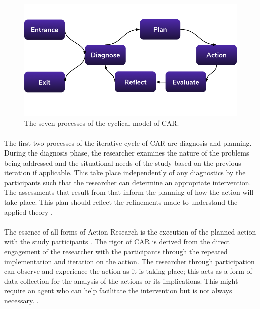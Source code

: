 \begin{figure}[h!]
    \centering
    \includegraphics[width=\linewidth]{Figures/CAR.png}
    \caption{The seven processes of the cyclical model of CAR.}
\end{figure}

\paragraph{} The first two processes of the iterative cycle of CAR are diagnosis and planning. During the diagnosis phase, the researcher examines the nature of the problems being addressed and the situational needs of the study based on the previous iteration if applicable. This take place independently of any diagnostics by the participants such that the researcher can determine an appropriate intervention. The assessments that result from that inform the planning of how the action will take place. This plan should reflect the refinements made to understand the applied theory \autocite{davison_principles_2004}.

\paragraph{} The essence of all forms of Action Research is the execution of the planned action with the study participants \autocite{lewin_action_1946}. The rigor of CAR is derived from the direct engagement of the researcher with the participants through the repeated implementation and iteration on the action. The researcher through participation can observe and experience the action as it is taking place; this acts as a form of data collection for the analysis of the actions or its implications. This might require an agent who can help facilitate the intervention but is not always necessary. \autocite{davison_principles_2004}.

